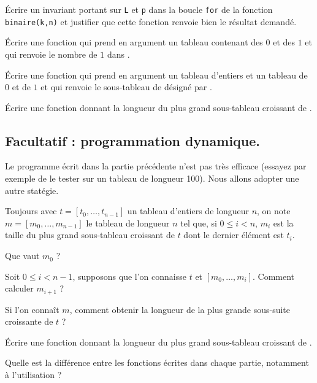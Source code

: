 \medskip{}

\question{} Écrire un invariant portant sur \texttt{L} et \texttt{p} dans la boucle \texttt{for} de la fonction \texttt{binaire(k,n)} et justifier que cette fonction renvoie bien le résultat demandé.

\medskip{}

\question{} \'Ecrire une fonction  qui prend en argument un tableau  contenant des $0$ et des $1$ et qui renvoie le nombre de $1$ dans .

\medskip{}

\question{} \'Ecrire une fonction  qui prend en argument un tableau  d'entiers et un tableau  de $0$ et de $1$ et qui renvoie le sous-tableau de  désigné par .

\medskip{}

\question{} \'Ecrire une fonction  donnant la longueur du plus grand sous-tableau croissant de .

\subsection{Facultatif : programmation dynamique.}

Le programme écrit dans la partie précédente n'est pas très efficace (essayez par exemple de le tester sur un tableau de longueur 100). Nous allons adopter une autre statégie. 

Toujours avec $t = [t_0,\dots,t_{n-1}]$ un tableau d'entiers de longueur $n$, on note $m = [m_0,\dots,m_{n-1}]$ le tableau de longueur $n$ tel que, si $0\leq i < n$, $m_i$ est la taille du plus grand sous-tableau croissant de $t$ dont le dernier élément est $t_i$.

\medskip{}

\question{} Que vaut $m_0$ ? 

\medskip{}

\question{} Soit $0\leq i < n-1$, supposons que l'on connaisse $t$ et $[m_0,\dots,m_i]$. Comment calculer $m_{i+1}$ ? 

\medskip{}

\question{} Si l'on connaît $m$, comment obtenir la longueur de la plus grande sous-suite croissante de $t$ ? 

\medskip{}

\question{} \'Ecrire une fonction  donnant la longueur du plus grand sous-tableau croissant de .

\medskip{}

\question{} Quelle est la différence entre les fonctions écrites dans chaque partie, notamment à l'utilisation ? 